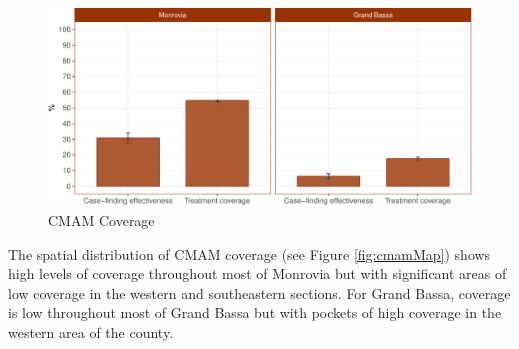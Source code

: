 \documentclass[12pt,a4paper]{article}
\theoremstyle{definition}
\theoremstyle{definition}
\theoremstyle{definition}
\theoremstyle{remark}
\begin{document}
\begin{figure}[H]

{\centering \includegraphics{liberiaCoverageReport_files/figure-latex/cmam1-1} 

}

\caption{CMAM Coverage}\label{fig:cmam1}
\end{figure}

\begin{table}[H]

\caption{\label{tab:cmam2}CMAM coverage}
\centering
{}
\end{table}

The spatial distribution of CMAM coverage (see Figure \ref{fig:cmamMap})
shows high levels of coverage throughout most of Monrovia but with
significant areas of low coverage in the western and southeastern
sections. For Grand Bassa, coverage is low throughout most of Grand
Bassa but with pockets of high coverage in the western area of the
county.
\end{document}
